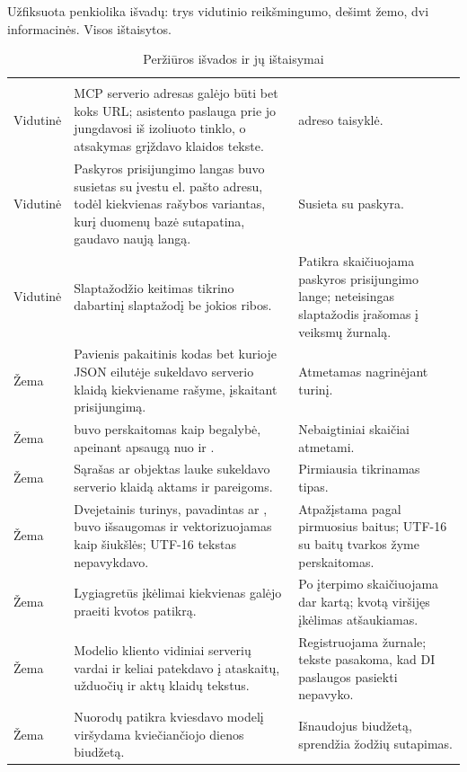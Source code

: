 Užfiksuota penkiolika išvadų: trys vidutinio reikšmingumo, dešimt žemo, dvi informacinės.
Visos ištaisytos.

\begin{xltabular}{\textwidth}{@{}L{15mm}YL{50mm}@{}}
\caption{Peržiūros išvados ir jų ištaisymai}\label{tab:security:findings}\\
\toprule
{} &  &  \\
\midrule
\endfirsthead
\toprule
{} &  &  \\
\midrule
\endhead
\bottomrule
\endlastfoot
Vidutinė & MCP serverio adresas galėjo būti bet koks URL; asistento paslauga prie jo jungdavosi iš izoliuoto tinklo, o atsakymas grįždavo klaidos tekste. &  adreso taisyklė. \\
Vidutinė & Paskyros prisijungimo langas buvo susietas su įvestu el. pašto adresu, todėl kiekvienas rašybos variantas, kurį duomenų bazė sutapatina, gaudavo naują langą. & Susieta su paskyra. \\
Vidutinė & Slaptažodžio keitimas tikrino dabartinį slaptažodį be jokios ribos. & Patikra skaičiuojama paskyros prisijungimo lange; neteisingas slaptažodis įrašomas į veiksmų žurnalą. \\
Žema & Pavienis pakaitinis kodas bet kurioje JSON eilutėje sukeldavo serverio klaidą kiekviename rašyme, įskaitant prisijungimą. & Atmetamas nagrinėjant turinį. \\
Žema &  buvo perskaitomas kaip begalybė, apeinant apsaugą nuo  ir . & Nebaigtiniai skaičiai atmetami. \\
Žema & Sąrašas ar objektas lauke  sukeldavo serverio klaidą aktams ir pareigoms. & Pirmiausia tikrinamas tipas. \\
Žema & Dvejetainis turinys, pavadintas  ar , buvo išsaugomas ir vektorizuojamas kaip šiukšlės; UTF-16 tekstas nepavykdavo. & Atpažįstama pagal pirmuosius baitus; UTF-16 su baitų tvarkos žyme perskaitomas. \\
Žema & Lygiagretūs įkėlimai kiekvienas galėjo praeiti kvotos patikrą. & Po įterpimo skaičiuojama dar kartą; kvotą viršijęs įkėlimas atšaukiamas. \\
Žema & Modelio kliento vidiniai serverių vardai ir keliai patekdavo į ataskaitų, užduočių ir aktų klaidų tekstus. & Registruojama žurnale; tekste pasakoma, kad DI paslaugos pasiekti nepavyko. \\
Žema & Nuorodų patikra kviesdavo modelį viršydama kviečiančiojo dienos biudžetą. & Išnaudojus biudžetą, sprendžia žodžių sutapimas. \\

\end{xltabular}
